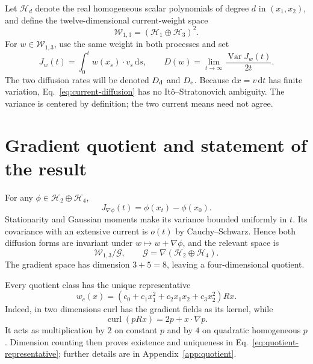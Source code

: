 \documentclass[aps,pre,reprint,amsmath,amssymb,superscriptaddress,nofootinbib]{revtex4-2}
\newcommand{\dd}{\mathrm{d}}
\newcommand{\Var}{\operatorname{Var}}
\newcommand{\grad}{\nabla}
\newcommand{\cH}{\mathcal{H}}
\newcommand{\cW}{\mathcal{W}}
\newcommand{\cG}{\mathcal{G}}
\begin{document}
Let $\cH_d$ denote the real homogeneous scalar polynomials of degree $d$ in
$(x_1,x_2)$, and define the twelve-dimensional current-weight space
\begin{equation}
 \cW_{1,3}=(\cH_1\oplus\cH_3)^2.
\end{equation}
For $w\in\cW_{1,3}$, use the same weight in both processes and set
\begin{equation}
 J_w(t)=\int_0^t w(x_s)\mathbin{\cdot}v_s\,\dd s,
 \qquad
 D(w)=\lim_{t\to\infty}\frac{\Var J_w(t)}{2t}.
\label{eq:current-diffusion}
\end{equation}
The two diffusion rates will be denoted $D_{\rm d}$ and $D_{\rm e}$.
Because $\dd x=v\,\dd t$ has finite variation, Eq.~\eqref{eq:current-diffusion}
has no It\^o--Stratonovich ambiguity.  The variance is centered by definition;
the two current means need not agree.

\section{Gradient quotient and statement of the result}
\label{sec:quotient}

For any $\phi\in\cH_2\oplus\cH_4$,
\begin{equation}
 J_{\grad\phi}(t)=\phi(x_t)-\phi(x_0).
\end{equation}
Stationarity and Gaussian moments make its variance bounded uniformly in
$t$.  Its covariance with an extensive current is $o(t)$ by
Cauchy--Schwarz.  Hence both diffusion forms are invariant under
$w\mapsto w+\grad\phi$, and the relevant space is
\begin{equation}
 \cW_{1,3}/\cG,\qquad
 \cG=\grad(\cH_2\oplus\cH_4).
\end{equation}
The gradient space has dimension $3+5=8$, leaving a four-dimensional
quotient.

Every quotient class has the unique representative
\begin{equation}
 w_c(x)=\left(c_0+c_1x_1^2+c_2x_1x_2+c_3x_2^2\right)Rx.
\label{eq:quotient-representative}
\end{equation}
Indeed, in two dimensions curl has the gradient fields as its kernel, while
\begin{equation}
 \operatorname{curl}(pRx)=2p+x\mathbin{\cdot}\grad p.
\label{eq:curl}
\end{equation}
It acts as multiplication by $2$ on constant $p$ and by $4$ on
quadratic homogeneous $p$.  Dimension counting then proves existence and
uniqueness in Eq.~\eqref{eq:quotient-representative}; further details are in
Appendix~\ref{app:quotient}.
\end{document}

